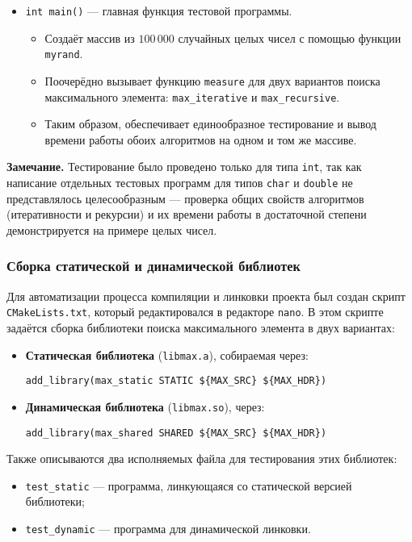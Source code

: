 \begin{itemize}
\item \texttt{int main()} — главная функция тестовой программы. 
  \begin{itemize}
      \item Создаёт массив из $100\,000$ случайных целых чисел с помощью функции \texttt{myrand}.
      \item Поочерёдно вызывает функцию \texttt{measure} для двух вариантов поиска максимального элемента: \texttt{max\_iterative} и \texttt{max\_recursive}.
      \item Таким образом, обеспечивает единообразное тестирование и вывод времени работы обоих алгоритмов на одном и том же массиве.
  \end{itemize}
\end{itemize}

\vspace{0.3cm}
\noindent\textbf{Замечание.} Тестирование было проведено только для типа \texttt{int}, так как написание отдельных тестовых программ для типов \texttt{char} и \texttt{double} не представлялось целесообразным — проверка общих свойств алгоритмов (итеративности и рекурсии) и их времени работы в достаточной степени демонстрируется на примере целых чисел.

\subsubsection{Сборка статической и динамической библиотек}

Для автоматизации процесса компиляции и линковки проекта был создан скрипт \texttt{CMakeLists.txt}, который редактировался в редакторе \texttt{nano}.
\vspace{0.5em}
В этом скрипте задаётся сборка библиотеки поиска максимального элемента в двух вариантах:
\begin{itemize}
\item \textbf{Статическая библиотека} (\texttt{libmax.a}), собираемая через:
\begin{lstlisting}
add_library(max_static STATIC ${MAX_SRC} ${MAX_HDR})
\end{lstlisting}
\item \textbf{Динамическая библиотека} (\texttt{libmax.so}), через:
\begin{lstlisting}
add_library(max_shared SHARED ${MAX_SRC} ${MAX_HDR})
\end{lstlisting}
\end{itemize}

Также описываются два исполняемых файла для тестирования этих библиотек:
\begin{itemize}
\item \texttt{test\_static} — программа, линкующаяся со статической версией библиотеки;
\item \texttt{test\_dynamic} — программа для динамической линковки.
\end{itemize}

